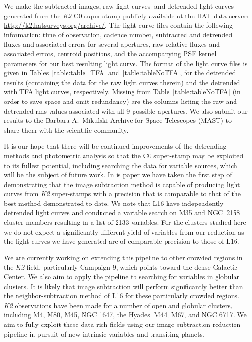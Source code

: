\documentclass[apjl]{emulateapj}
\begin{document}
We make the subtracted images, raw light curves, and detrended light
curves generated from the \textit{K2} C0 super-stamp publicly available
at the HAT data server: 
\url{http://k2.hatsurveys.org/archive/}.  The light curve files contain
the following information: time of observation, cadence number,
subtracted and detrended fluxes and associated errors for several
apertures, raw relative fluxes and associated errors, centroid
positions, and the accompanying PSF kernel parameters for our best
resulting light curve. The format of the light curve files is given in
Tables~\ref{table:table_TFA} and~\ref{table:tableNoTFA}, for the
detrended results (containing the data for the raw light curves therein)
and the detrended with TFA light curves, respectively.  Missing from
Table~\ref{table:tableNoTFA} (in order to save space and omit
redundancy) are the columns listing the raw and detrended rms values
associated with all 9 possible apertures. We also submit our results to
the Barbara A.~Mikulski Archive for Space Telescopes (MAST) to share
them with the scientific community.

It is our hope that there will be continued improvements of the
detrending methods and photometric analysis so that the C0 super-stamp
may be exploited to its fullest potential, including searching the data
for variable sources, which will be the subject of future work. In is
paper we have taken the first step of demonstrating that the image
subtraction method is capable of producing light curves from {\em K2}
super-stamps with a precision that is comparable to that of the best
method demonstrated to date.  We note that L16 have independently
detrended light curves and conducted a variable search on M35 and
NGC~2158 cluster members resulting in a list of 2133 variables.  For the
clusters studied here we do not expect a significantly different yield
of variables from our reduction as the light curves we have generated
are of comparable precision to those of L16.

We are currently working on extending this pipeline to other crowded
regions in the \textit{K2} field, particularly Campaign 9, which points
toward the dense Galactic Center.  We also aim to apply the pipeline to
searching for variables in globular clusters.  It is likely that image
subtraction will perform significantly better than the
neighbor-subtraction method of L16 for these particularly crowded
regions.  \textit{K2} observations have been made for a number of open
and globular clusters, including M4, M80, M45, NGC 1647, the Hyades,
M44, M67, and NGC 6717.  We aim to fully exploit these data-rich fields
using our image subtraction reduction pipeline in pursuit of new
intrinsic variables and transiting planets.
\end{document}
